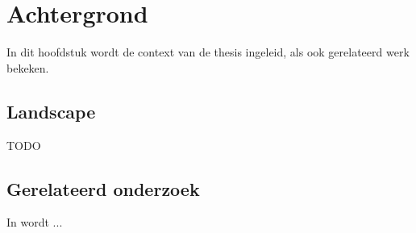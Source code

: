 \chapter{Achtergrond}
\label{achtergrond}

In dit hoofdstuk wordt de context van de thesis ingeleid, als ook gerelateerd werk bekeken.

\section{Landscape}

TODO

\section{Gerelateerd onderzoek}

In \cite{zhang2000intrusion} wordt ...

